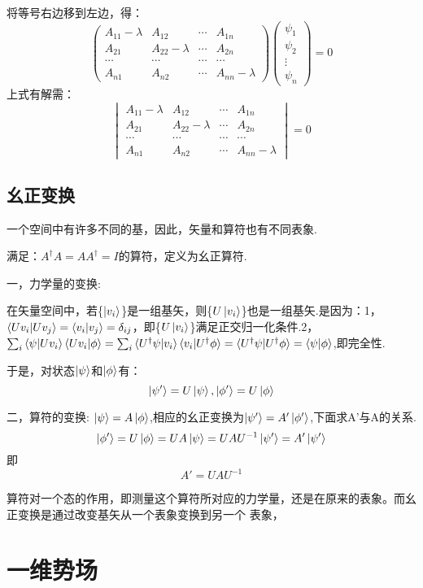 \documentclass[13pt,a4paper]{article}
\begin{document}
\begin{CJK}{UTF8}{song}
将等号右边移到左边，得：$$\begin{pmatrix}A_{11}-\lambda&A_{12}&\cdots &A_{1n}\\A_{21}&A_{22}-\lambda&\cdots &A_{2n}\\\cdots&\cdots&\cdots &\cdots\\A_{n1}&A_{n2}&\cdots &A_{nn}-\lambda\end{pmatrix}\begin{pmatrix}\psi_1\\\psi_2\\ \vdots \\\psi_n\end{pmatrix}=0$$
上式有解需：$$\begin{vmatrix}A_{11}-\lambda&A_{12}&\cdots &A_{1n}\\A_{21}&A_{22}-\lambda&\cdots &A_{2n}\\\cdots&\cdots&\cdots &\cdots\\A_{n1}&A_{n2}&\cdots &A_{nn}-\lambda\end{vmatrix}=0$$



\subsection{幺正变换}
\par 一个空间中有许多不同的基，因此，矢量和算符也有不同表象.

满足：$A^{\dagger}A=AA^{\dagger}=I$的算符，定义为幺正算符.

一，力学量的变换:

在矢量空间中，若\{$\ket{v_i}$\}是一组基矢，则\{$U\ket{v_i}$\}也是一组基矢.是因为：1，$\braket{Uv_i|Uv_j}=\braket{v_i|v_j}=\delta_{ij}$，即\{$U\ket{v_i}$\}满足正交归一化条件.2，$\sum_i\braket{\psi|Uv_i}\braket{Uv_i|\phi}=\sum_i\braket{U^\dagger\psi|v_i}\braket{v_i|U^\dagger\phi}=\braket{U^\dagger\psi|U^\dagger\phi}=\braket{\psi|\phi}$,即完全性.

于是，对状态$\ket{\psi}$和$\ket{\phi}$有：$$\ket{\psi'}=U\ket{\psi},\ket{\phi'}=U\ket{\phi}$$

二，算符的变换:
$\ket{\psi}=A\ket{\phi}$,相应的幺正变换为$\ket{\psi'}=A'\ket{\phi'}$,下面求A'与A的关系.
 $$\ket{\phi'}=U\ket{\phi}=UA\ket{\psi}=UAU^{-1}\ket{\psi'}=A'\ket{\psi'}$$
 即$$A'=UAU^{-1}$$

算符对一个态的作用，即测量这个算符所对应的力学量，还是在原来的表象。而幺正变换是通过改变基矢从一个表象变换到另一个
表象，

 
 
 \section{一维势场}




\end{CJK}
\end{document}

